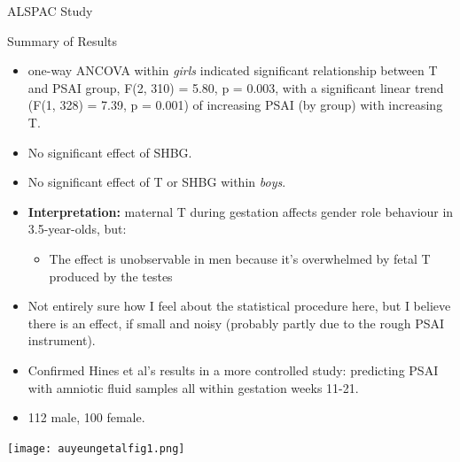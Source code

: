 \documentclass[hyperref={pdfpagelabels=false}]{beamer}
\begin{document}
\begin{frame}{ALSPAC Study \citep{hinesetal2002}}
\begin{block}{Summary of Results}
	\begin{itemize}
	\item one-way ANCOVA within \textsl{girls} indicated significant relationship between T and PSAI group, F(2, 310) = 5.80, p = 0.003, with a significant linear trend (F(1, 328) = 7.39, p = 0.001) of increasing PSAI (by group) with increasing T.
	\item No significant effect of SHBG.
	\item No significant effect of T or SHBG within \textsl{boys}.
	\item \textbf{Interpretation:} maternal T during gestation affects gender role behaviour in 3.5-year-olds, but:
		\begin{itemize}
			\item The effect is unobservable in men because it's overwhelmed by fetal T produced by the testes
		\end{itemize}
	\item Not entirely sure how I feel about the statistical procedure here, but I believe there is an effect, if small and noisy (probably partly due to the rough PSAI instrument).
	\end{itemize}
\end{block}
\end{frame}



\begin{frame}{\citet{auyeungetal2009}}
\begin{itemize}
	\item Confirmed Hines et al's results in a more controlled study: predicting PSAI with amniotic fluid samples all within gestation weeks 11-21.
	\item 112 male, 100 female.
	\end{itemize}

\end{frame}

\begin{frame}{\citet{auyeungetal2009}}

\begin{center}
	\texttt{[image: auyeungetalfig1.png]}
\end{center}

\end{frame}
\end{document}
